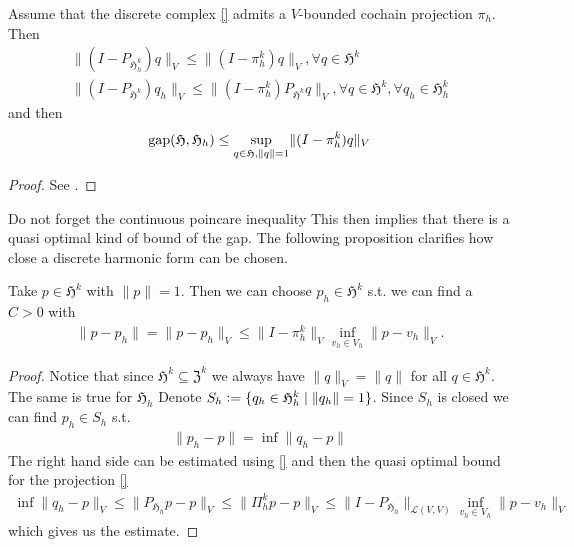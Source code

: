 \documentclass[../master_thesis.tex]{subfiles}
\begin{document}
\begin{proposition}
    Assume that the discrete complex \ref{} admits a $V$-bounded cochain projection
    $\pi_h$. Then
    \begin{align*}
        \lVert (I - P_{\mathfrak{H}^k_h}) q \rVert _V \leq \lVert (I - \pi_h^k) q \rVert _V, 
            \forall q \in \mathfrak{H}^k 
        \\ \lVert (I - P_{\mathfrak{H}^k}) q_h \rVert _V 
        \leq \lVert (I - \pi_h^k)P_{\mathfrak{H}^k} q \rVert _V, \forall q \in \mathfrak{H}^k, 
                \forall q_h \in \mathfrak{H}^k_h 
    \end{align*}
    and then 
    \begin{align*}
        \operatorname{gap} (\mathfrak{H}, \mathfrak{H}_h) 
        \leq \sup_{q \in \mathfrak{H}, \lVert q \rVert = 1} \lVert (I - \pi_h^k) q \rVert _V
    \end{align*}
\end{proposition}
\begin{proof}
    See \cite[Thm.\,5.2]{arnold}. 
\end{proof}
{\color{red} Do not forget the continuous poincare inequality} This then implies 
that there is a quasi optimal kind of bound of the gap. The following proposition 
clarifies how close a discrete harmonic form can be chosen.

\begin{proposition}
    Take $p \in \mathfrak{H}^k$ with $\lVert p \rVert = 1$. Then we can 
    choose $p_h \in \mathfrak{H}^k$ s.t. we can find a $C>0$ with 
    \begin{align*}
        \lVert p - p_h \rVert = \lVert p - p_h \rVert _V 
        \leq \lVert I - \pi_h^k\rVert _V \inf_{v_h \in V_h} \lVert p - v_h \rVert _V.
    \end{align*}
\end{proposition}
\begin{proof}
    Notice that since $\mathfrak{H}^k \subseteq \mathfrak{Z}^k$ we always have
    $\lVert q \rVert _V = \lVert q \rVert$ for all $q \in \mathfrak{H}^k$. The same is 
    true for $\mathfrak{H}_h$
    Denote $S_h \vcentcolon= \{ q_h \in \mathfrak{H}^k_h \mid \lVert q_h \rVert = 1 \}$.
    Since $S_h$ is closed we can find $p_h \in S_h$ s.t. 
    \begin{align*}
        \lVert p_h - p \rVert = \inf \lVert q_h - p \rVert
    \end{align*}
    The right hand side can be estimated using \ref{} and then the 
    quasi optimal bound for the projection \ref{}
    \begin{align*}
        \inf \lVert q_h - p \rVert _V \leq \lVert P_{\mathfrak{H}_h}p - p \rVert _V
        \leq \lVert \Pi_h^k p - p \rVert _V 
        \leq \lVert I - P_{\mathfrak{H}_h}\rVert _{\mathcal{L}(V,V)}
            \inf_{v_h \in V_h} \lVert p - v_h \rVert _V
    \end{align*}
    which gives us the estimate.
\end{proof}
\end{document}
